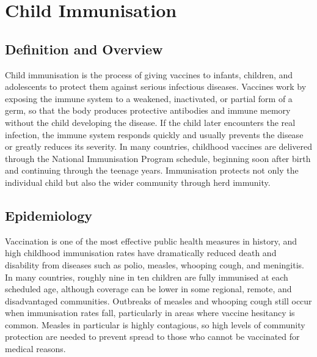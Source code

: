 \chapter{Child Immunisation}

\section*{Definition and Overview}
Child immunisation is the process of giving vaccines to infants, children, and adolescents to protect them against serious infectious diseases. Vaccines work by exposing the immune system to a weakened, inactivated, or partial form of a germ, so that the body produces protective antibodies and immune memory without the child developing the disease. If the child later encounters the real infection, the immune system responds quickly and usually prevents the disease or greatly reduces its severity. In many countries, childhood vaccines are delivered through the National Immunisation Program schedule, beginning soon after birth and continuing through the teenage years. Immunisation protects not only the individual child but also the wider community through herd immunity.

\section*{Epidemiology}
Vaccination is one of the most effective public health measures in history, and high childhood immunisation rates have dramatically reduced death and disability from diseases such as polio, measles, whooping cough, and meningitis. In many countries, roughly nine in ten children are fully immunised at each scheduled age, although coverage can be lower in some regional, remote, and disadvantaged communities. Outbreaks of measles and whooping cough still occur when immunisation rates fall, particularly in areas where vaccine hesitancy is common. Measles in particular is highly contagious, so high levels of community protection are needed to prevent spread to those who cannot be vaccinated for medical reasons.

